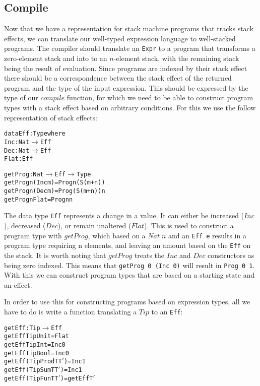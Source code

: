 \subsection{Compile}
Now that we have a representation for stack machine programs that tracks stack effects, we can translate our well-typed expression language to well-stacked programs. The compiler should translate an \texttt{Expr} to a program that transforms a zero-element stack and into to an $n$-element stack, with the remaining stack being the result of evaluation. Since programs are indexed by their stack effect there should be a correspondence between the stack effect of the returned program and the type of the input expression. This should be expressed by the type of our $compile$ function, for which we need to be able to construct program types with a stack effect based on arbitrary  conditions. For this we use the follow representation of stack effects:

\begin{alltt}
data Eff : Type where
	Inc  : Nat \(\rightarrow\)  Eff
	Dec  : Nat \(\rightarrow\)  Eff
	Flat :        Eff

getProg : Nat \(\rightarrow\)  Eff \(\rightarrow\)  Type
getProg n (Inc m) = Prog n (S (m + n))
getProg n (Dec m) = Prog (S (m + n)) n
getProg n Flat    = Prog n n
\end{alltt}

The data type \texttt{Eff} represents a change in a value. It can either be increased ($Inc$), decreased ($Dec$), or remain unaltered ($Flat$). This is used to construct a program type with $getProg$, which based on a $Nat\;n$ and an \texttt{Eff e} results in a program type requiring n elements, and leaving an amount based on the \texttt{Eff} on the stack. It is worth noting that $getProg$ treats the $Inc$ and $Dec$ constructors as being zero indexed. This means that \texttt{getProg 0 (Inc 0)} will result in \texttt{Prog 0 1}. With this we can construct program types that are based on a starting state and an effect.

In order to use this for constructing programs based on expression types, all we have to do is write a function translating a $Tip$ to an \texttt{Eff}:

\begin{alltt}
getEff : Tip \(\rightarrow\) Eff
getEff TipUnit        = Flat
getEff TipInt         = Inc 0
getEff TipBool        = Inc 0
getEff (TipProd T T\('\)) = Inc 1
getEff (TipSum T T\('\))  = Inc 1
getEff (TipFun T T\('\))  = getEff T\('\)
\end{alltt}


